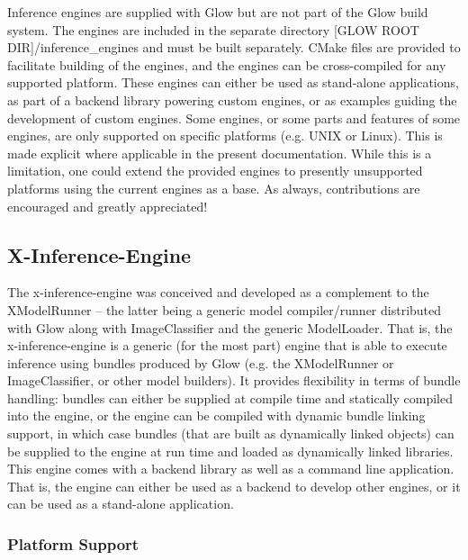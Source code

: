 Inference engines are supplied with Glow but are not part of the Glow build system. The engines are included in the separate directory {\ttfamily \mbox{[}G\+L\+OW R\+O\+OT D\+IR\mbox{]}/inference\+\_\+engines} and must be built separately. C\+Make files are provided to facilitate building of the engines, and the engines can be cross-\/compiled for any supported platform. These engines can either be used as stand-\/alone applications, as part of a backend library powering custom engines, or as examples guiding the development of custom engines. Some engines, or some parts and features of some engines, are only supported on specific platforms (e.\+g. U\+N\+IX or Linux). This is made explicit where applicable in the present documentation. While this is a limitation, one could extend the provided engines to presently unsupported platforms using the current engines as a base. As always, contributions are encouraged and greatly appreciated!

\subsection*{X-\/\+Inference-\/\+Engine}

The {\ttfamily x-\/inference-\/engine} was conceived and developed as a complement to the {\ttfamily X\+Model\+Runner} -- the latter being a generic model compiler/runner distributed with Glow along with {\ttfamily Image\+Classifier} and the generic {\ttfamily Model\+Loader}. That is, the {\ttfamily x-\/inference-\/engine} is a generic (for the most part) engine that is able to execute inference using bundles produced by Glow (e.\+g. the {\ttfamily X\+Model\+Runner} or {\ttfamily Image\+Classifier}, or other model builders). It provides flexibility in terms of bundle handling\+: bundles can either be supplied at compile time and statically compiled into the engine, or the engine can be compiled with dynamic bundle linking support, in which case bundles (that are built as dynamically linked objects) can be supplied to the engine at run time and loaded as dynamically linked libraries. This engine comes with a backend library as well as a command line application. That is, the engine can either be used as a backend to develop other engines, or it can be used as a stand-\/alone application.

\subsubsection*{Platform Support}

